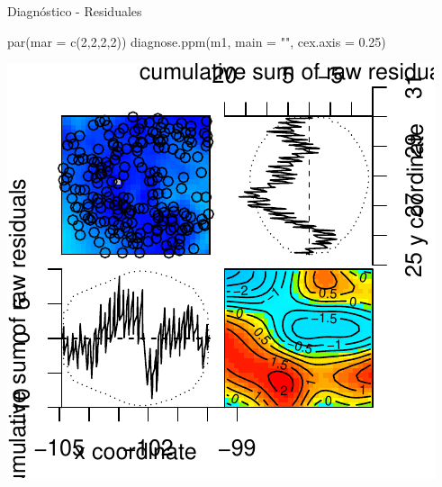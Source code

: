\documentclass[
  11pt,
  ignorenonframetext,
]{beamer}
\newenvironment{Shaded}{}{}
\newcommand{\AttributeTok}[1]{\textcolor[rgb]{0.49,0.56,0.16}{#1}}
\newcommand{\DecValTok}[1]{\textcolor[rgb]{0.25,0.63,0.44}{#1}}
\newcommand{\FloatTok}[1]{\textcolor[rgb]{0.25,0.63,0.44}{#1}}
\newcommand{\FunctionTok}[1]{\textcolor[rgb]{0.02,0.16,0.49}{#1}}
\newcommand{\NormalTok}[1]{#1}
\newcommand{\StringTok}[1]{\textcolor[rgb]{0.25,0.44,0.63}{#1}}
\begin{document}
\begin{frame}[fragile]{Diagnóstico - Residuales}
\protect\hypertarget{diagnuxf3stico---residuales}{}
\begin{Shaded}
\begin{Highlighting}[]
\FunctionTok{par}\NormalTok{(}\AttributeTok{mar =} \FunctionTok{c}\NormalTok{(}\DecValTok{2}\NormalTok{,}\DecValTok{2}\NormalTok{,}\DecValTok{2}\NormalTok{,}\DecValTok{2}\NormalTok{))}
\FunctionTok{diagnose.ppm}\NormalTok{(m1, }\AttributeTok{main =} \StringTok{""}\NormalTok{, }\AttributeTok{cex.axis =} \FloatTok{0.25}\NormalTok{)}
\end{Highlighting}
\end{Shaded}

\begin{center}\includegraphics{Tutorial-spatstat-2_files/figure-beamer/unnamed-chunk-17-1} \end{center}
\end{frame}
\end{document}

